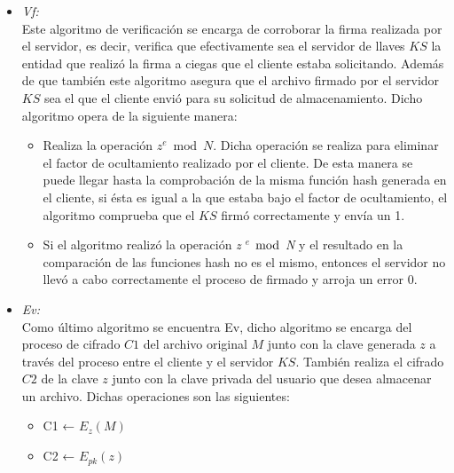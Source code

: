 \begin{itemize}
\item \textit{Vf: }\\

Este algoritmo de verificación se encarga de corroborar la firma realizada por el servidor, es decir, verifica que efectivamente sea el servidor de llaves $KS$ la entidad que realizó la firma a ciegas que el cliente estaba solicitando. Además de que también este algoritmo asegura que el archivo firmado por el servidor $KS$ sea el que el cliente envió para su solicitud de almacenamiento. 
Dicho algoritmo opera de la siguiente manera: 
\begin{itemize}
\item Realiza la operación $z^e \bmod N $. Dicha operación se realiza para eliminar el factor de ocultamiento realizado por el cliente. De esta manera se puede llegar hasta la comprobación de la misma función hash generada en el cliente, si ésta es igual a la que estaba bajo el factor de ocultamiento, el algoritmo comprueba que el $KS$ firmó correctamente y envía un 1. 
\item Si el algoritmo realizó la operación \textit{z $^e$ $\bmod$ N} y el resultado en la comparación de las funciones hash no es el mismo, entonces el servidor no llevó a cabo correctamente el proceso de firmado y arroja un error 0. 

\end{itemize}

\item \textit{Ev: }\\
Como último algoritmo se encuentra Ev, dicho algoritmo se encarga del proceso de cifrado $C1$ del archivo original $M$ junto con la clave generada $z$ a través del proceso entre el cliente y el servidor $KS$. También realiza el cifrado $C2$ de la clave $z$ junto con la clave privada del usuario que desea almacenar un archivo. Dichas operaciones son las siguientes: 

\begin{itemize}
\item C1 ← $E_{z}(M)$
\item C2 ← $E_{pk}(z)$
\end{itemize}


\end{itemize}

